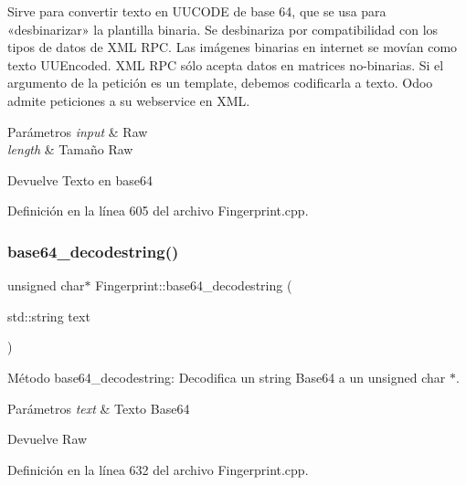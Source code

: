 Sirve para convertir texto en U\+U\+C\+O\+DE de base 64, que se usa para «desbinarizar» la plantilla binaria. Se desbinariza por compatibilidad con los tipos de datos de X\+ML R\+PC. Las imágenes binarias en internet se movían como texto U\+U\+Encoded. X\+ML R\+PC sólo acepta datos en matrices no-\/binarias. Si el argumento de la petición es un template, debemos codificarla a texto. Odoo admite peticiones a su webservice en X\+ML. 
\begin{DoxyParams}{Parámetros}
{\em input} & Raw \\
\hline
{\em length} & Tamaño Raw \\
\hline
\end{DoxyParams}
\begin{DoxyReturn}{Devuelve}
Texto en base64 
\end{DoxyReturn}


Definición en la línea 605 del archivo Fingerprint.\+cpp.

\hypertarget{classFingerprint_a4f4c8a3a0e248d18f69c6057562b8031}{}\label{classFingerprint_a4f4c8a3a0e248d18f69c6057562b8031} 
\subsubsection{\texorpdfstring{base64\+\_\+decodestring()}{base64\_decodestring()}}
{\footnotesize\ttfamily unsigned char$\ast$ Fingerprint\+::base64\+\_\+decodestring (\begin{DoxyParamCaption}\item[{std\+::string}]{text }\end{DoxyParamCaption})\hspace{0.3cm}{\ttfamily [inline]}}



Método base64\+\_\+decodestring\+: Decodifica un string Base64 a un unsigned char $\ast$. 


\begin{DoxyParams}{Parámetros}
{\em text} & Texto Base64 \\
\hline
\end{DoxyParams}
\begin{DoxyReturn}{Devuelve}
Raw 
\end{DoxyReturn}


Definición en la línea 632 del archivo Fingerprint.\+cpp.

\hypertarget{classFingerprint_a991f8682bd5fb908804eb35e2c584d17}{}\label{classFingerprint_a991f8682bd5fb908804eb35e2c584d17} 
